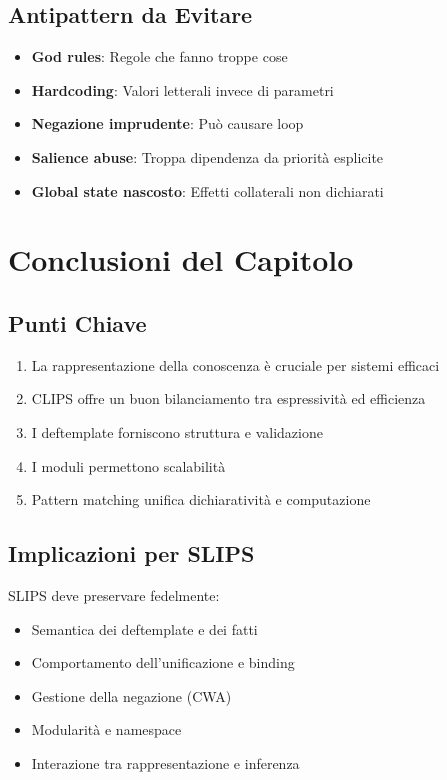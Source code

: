 \subsection{Antipattern da Evitare}

\begin{warningbox}
\begin{itemize}
\item \textbf{God rules}: Regole che fanno troppe cose
\item \textbf{Hardcoding}: Valori letterali invece di parametri
\item \textbf{Negazione imprudente}: Può causare loop
\item \textbf{Salience abuse}: Troppa dipendenza da priorità esplicite
\item \textbf{Global state nascosto}: Effetti collaterali non dichiarati
\end{itemize}
\end{warningbox}

\section{Conclusioni del Capitolo}

\subsection{Punti Chiave}

\begin{enumerate}
\item La rappresentazione della conoscenza è cruciale per sistemi efficaci
\item CLIPS offre un buon bilanciamento tra espressività ed efficienza
\item I deftemplate forniscono struttura e validazione
\item I moduli permettono scalabilità
\item Pattern matching unifica dichiaratività e computazione
\end{enumerate}

\subsection{Implicazioni per SLIPS}

SLIPS deve preservare fedelmente:
\begin{itemize}
\item Semantica dei deftemplate e dei fatti
\item Comportamento dell'unificazione e binding
\item Gestione della negazione (CWA)
\item Modularità e namespace
\item Interazione tra rappresentazione e inferenza
\end{itemize}

